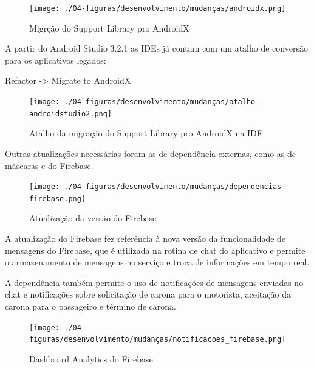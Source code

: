 \begin{figure}[H]
	\centering
	\caption{Migrção do Support Library pro AndroidX}
	\texttt{[image: ./04-figuras/desenvolvimento/mudanças/androidx.png]}
	\label{fig:1}
\end{figure}
	
A partir do Android Studio 3.2.1 as IDEs já contam com um atalho de conversão para os aplicativos legados:

Refactor -> Migrate to AndroidX

\begin{figure}[H]
	\centering
	\caption{Atalho da migração do Support Library pro AndroidX na IDE}
	\texttt{[image: ./04-figuras/desenvolvimento/mudanças/atalho-androidstudio2.png]}
	\label{fig:2}
\end{figure}

Outras atualizações necessárias foram as de dependência externas, como as de máscaras e do Firebase.

\begin{figure}[H]
	\centering
	\caption{Atualização da versão do Firebase}
	\texttt{[image: ./04-figuras/desenvolvimento/mudanças/dependencias-firebase.png]}
	\label{fig:7}
\end{figure}

A atualização do Firebase fez referência à nova versão da funcionalidade de mensagens do Firebase, que é utilizada na rotina de chat do aplicativo e permite o armazenamento de mensagens no serviço e troca de informações em tempo real.

A dependência também permite o uso de notificações de mensagens enviadas no chat e notificações sobre solicitação de carona para o motorista, aceitação da carona para o passageiro e término de carona.

\begin{figure}[H]
	\centering
	\caption{Dashboard Analytics do Firebase}
	\texttt{[image: ./04-figuras/desenvolvimento/mudanças/notificacoes\_firebase.png]}
	\label{fig:facebook_analytics}
\end{figure}

